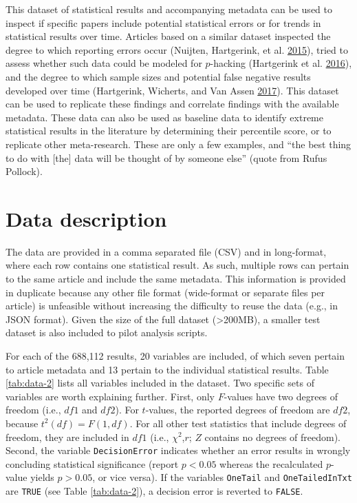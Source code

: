 \documentclass[a5paper]{book}
\begin{document}
This dataset of statistical results and accompanying metadata can be
used to inspect if specific papers include potential statistical errors
or for trends in statistical results over time. Articles based on a
similar dataset inspected the degree to which reporting errors occur
(Nuijten, Hartgerink, et al.
\protect\hyperlink{ref-doi:10.3758ux2fs13428-015-0664-2}{2015}), tried
to assess whether such data could be modeled for \(p\)-hacking
(Hartgerink et al.
\protect\hyperlink{ref-doi:10.7717ux2fpeerj.1935}{2016}), and the degree
to which sample sizes and potential false negative results developed
over time (Hartgerink, Wicherts, and Van Assen
\protect\hyperlink{ref-doi:10.1525ux2fcollabra.71}{2017}). This dataset
can be used to replicate these findings and correlate findings with the
available metadata. These data can also be used as baseline data to
identify extreme statistical results in the literature by determining
their percentile score, or to replicate other meta-research. These are
only a few examples, and \enquote{the best thing to do with {[}the{]}
data will be thought of by someone else} (quote from Rufus Pollock).

\section{Data description}\label{data-description}

The data are provided in a comma separated file (CSV) and in
long-format, where each row contains one statistical result. As such,
multiple rows can pertain to the same article and include the same
metadata. This information is provided in duplicate because any other
file format (wide-format or separate files per article) is unfeasible
without increasing the difficulty to reuse the data (e.g., in JSON
format). Given the size of the full dataset (\textgreater{}200MB), a
smaller test dataset is also included to pilot analysis scripts.

For each of the 688,112 results, 20 variables are included, of which
seven pertain to article metadata and 13 pertain to the individual
statistical results. Table \ref{tab:data-2} lists all variables included
in the dataset. Two specific sets of variables are worth explaining
further. First, only \(F\)-values have two degrees of freedom (i.e.,
\(df1\) and \(df2\)). For \(t\)-values, the reported degrees of freedom
are \(df2\), because \(t^2(df)=F(1,df)\). For all other test statistics
that include degrees of freedom, they are included in \(df1\) (i.e.,
\(\chi^2\),\(r\); \(Z\) contains no degrees of freedom). Second, the
variable \texttt{DecisionError} indicates whether an error results in
wrongly concluding statistical significance (report \(p<0.05\) whereas
the recalculated \(p\)-value yields \(p>0.05\), or vice versa). If the
variables \texttt{OneTail} and \texttt{OneTailedInTxt} are \texttt{TRUE}
(see Table \ref{tab:data-2}), a decision error is reverted to
\texttt{FALSE}.
\end{document}

